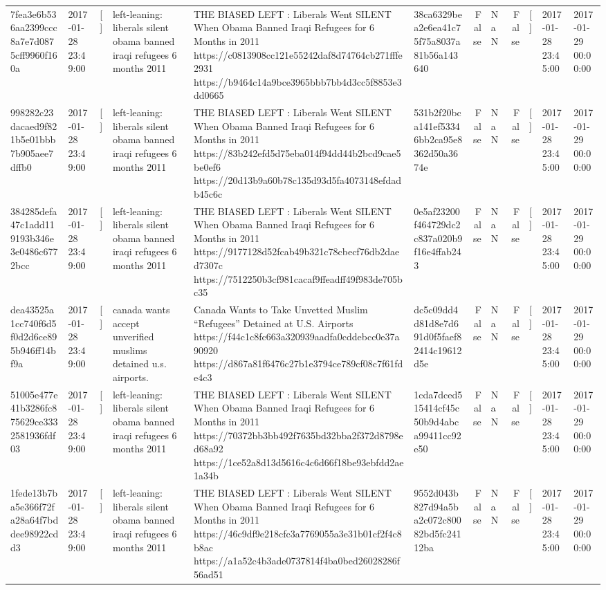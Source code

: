 \begin{tabular}{llllllrlrlll}
7fea3e6b536aa2399ccc8a7e7d0875cff9960f160a & 2017-01-28 23:49:00 & [] & left-leaning: liberals silent obama banned iraqi refugees 6 months 2011 & THE BIASED LEFT : Liberals Went SILENT When Obama Banned Iraqi Refugees for 6 Months in 2011 https://c0813908cc121e55242daf8d74764cb271fffe2931 https://b9464c14a9bce3965bbb7bb4d3cc5f8853e3dd0665 & 38ca6329bea2e6ea41c75f75a8037a81b56a143640 & False & NaN & False & [] & 2017-01-28 23:45:00 & 2017-01-29 00:00:00 \\
998282c23dacaed9f821b5e01bbb7b905aee7dffb0 & 2017-01-28 23:49:00 & [] & left-leaning: liberals silent obama banned iraqi refugees 6 months 2011 & THE BIASED LEFT : Liberals Went SILENT When Obama Banned Iraqi Refugees for 6 Months in 2011 https://83b242efd5d75eba014f94dd44b2bcd9cae5be0ef6 https://20d13b9a60b78c135d93d5fa4073148efdadb45c6c & 531b2f20bca141ef53346bb2ca95e8362d50a3674e & False & NaN & False & [] & 2017-01-28 23:45:00 & 2017-01-29 00:00:00 \\
384285defa47c1add119193b346e3e0486c6772bcc & 2017-01-28 23:49:00 & [] & left-leaning: liberals silent obama banned iraqi refugees 6 months 2011 & THE BIASED LEFT : Liberals Went SILENT When Obama Banned Iraqi Refugees for 6 Months in 2011 https://9177128d52fcab49b321c78cbecf76db2daed7307c https://7512250b3cf981cacaf9ffeadff49f983de705bc35 & 0e5af23200f464729dc2c837a020b9f16e4ffab243 & False & NaN & False & [] & 2017-01-28 23:45:00 & 2017-01-29 00:00:00 \\
dea43525a1cc740f6d5f0d2d6ce895b946ff14bf9a & 2017-01-28 23:49:00 & [] & canada wants accept unverified muslims detained u.s. airports. & Canada Wants to Take Unvetted Muslim “Refugees” Detained at U.S. Airports https://f44c1c8fc663a320939aadfa0cddebcc0e37a90920 https://d867a81f6476c27b1e3794ce789cf08c7f61fde4c3 & dc5c09dd4d81d8e7d691d0f5faef82414c19612d5e & False & NaN & False & [] & 2017-01-28 23:45:00 & 2017-01-29 00:00:00 \\
51005e477e41b3286fc875629ce3332581936fdf03 & 2017-01-28 23:49:00 & [] & left-leaning: liberals silent obama banned iraqi refugees 6 months 2011 & THE BIASED LEFT : Liberals Went SILENT When Obama Banned Iraqi Refugees for 6 Months in 2011 https://70372bb3bb492f7635bd32bba2f372d8798ed68a92 https://1ce52a8d13d5616c4c6d66f18be93ebfdd2ae1a34b & 1cda7dced515414cf45c50b9d4abca99411cc92e50 & False & NaN & False & [] & 2017-01-28 23:45:00 & 2017-01-29 00:00:00 \\
1fede13b7ba5e366f72fa28a64f7bddee98922cdd3 & 2017-01-28 23:49:00 & [] & left-leaning: liberals silent obama banned iraqi refugees 6 months 2011 & THE BIASED LEFT : Liberals Went SILENT When Obama Banned Iraqi Refugees for 6 Months in 2011 https://46c9df9e218cfc3a7769055a3e31b01cf2f4c8b8ac https://a1a52c4b3ade0737814f4ba0bed26028286f56ad51 & 9552d043b827d94a5ba2c072c80082bd5fc24112ba & False & NaN & False & [] & 2017-01-28 23:45:00 & 2017-01-29 00:00:00 \\

\end{tabular}

